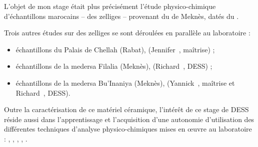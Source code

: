 L'objet de mon stage était plus précisément l'étude physico-chimique 
d'échantillons marocains -- des zelliges -- provenant du \PaM de 
Meknès, datés du .

Trois autres études sur des zelliges se sont déroulées en parallèle au 
laboratoire :

\begin{itemize}
  \item échantillons du Palais de Chellah (Rabat), 
         (Jennifer~, maîtrise) ;
  \item échantillons de la medersa Filalia (Meknès), 
         (Richard~, DESS) ;
  \item échantillons de la medersa Bu'Inaniya (Meknès), 
         (Yannick~, maîtrise et 
        Richard~, DESS).
\end{itemize}

Outre la caractérisation de ce matériel céramique, l'intérêt de ce 
stage de DESS réside aussi dans l'apprentissage et l'acquisition 
d'une autonomie d'utilisation des différentes techniques d'analyse 
physico-chimiques mises en {\oe}uvre au laboratoire : \MEB[ie], 
\EDS, \CL, \SAO, \DX.